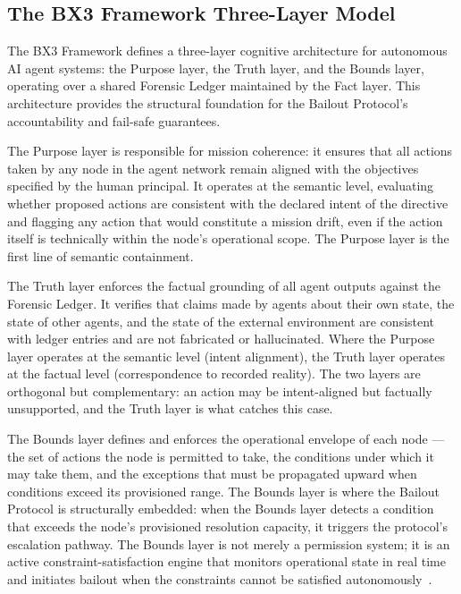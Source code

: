 \subsection{The BX3 Framework Three-Layer Model}
\label{sec:bx3-model}

The BX3 Framework defines a three-layer cognitive architecture for autonomous AI agent systems: the Purpose layer, the Truth layer, and the Bounds layer, operating over a shared Forensic Ledger maintained by the Fact layer. This architecture provides the structural foundation for the Bailout Protocol's accountability and fail-safe guarantees.

The Purpose layer is responsible for mission coherence: it ensures that all actions taken by any node in the agent network remain aligned with the objectives specified by the human principal. It operates at the semantic level, evaluating whether proposed actions are consistent with the declared intent of the directive and flagging any action that would constitute a mission drift, even if the action itself is technically within the node's operational scope. The Purpose layer is the first line of semantic containment.

The Truth layer enforces the factual grounding of all agent outputs against the Forensic Ledger. It verifies that claims made by agents about their own state, the state of other agents, and the state of the external environment are consistent with ledger entries and are not fabricated or hallucinated. Where the Purpose layer operates at the semantic level (intent alignment), the Truth layer operates at the factual level (correspondence to recorded reality). The two layers are orthogonal but complementary: an action may be intent-aligned but factually unsupported, and the Truth layer is what catches this case.

The Bounds layer defines and enforces the operational envelope of each node — the set of actions the node is permitted to take, the conditions under which it may take them, and the exceptions that must be propagated upward when conditions exceed its provisioned range. The Bounds layer is where the Bailout Protocol is structurally embedded: when the Bounds layer detects a condition that exceeds the node's provisioned resolution capacity, it triggers the protocol's escalation pathway. The Bounds layer is not merely a permission system; it is an active constraint-satisfaction engine that monitors operational state in real time and initiates bailout when the constraints cannot be satisfied autonomously~\cite{dijkstra1982,bansal2019}.

